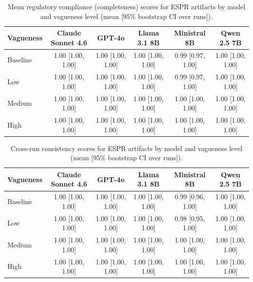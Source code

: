 \begin{table}[t]
  \centering
  \caption{Mean regulatory compliance (completeness) scores for ESPR artifacts by model and vagueness level (mean [95\% bootstrap CI over runs]).}
  \label{tab:espr_completeness}
  \begin{tabular}{lccccc}
    \toprule
    Vagueness & Claude Sonnet 4.6 & GPT-4o & Llama 3.1 8B & Ministral 8B & Qwen 2.5 7B \\
    \midrule
    Baseline & 1.00 {\scriptsize [1.00, 1.00]} & 1.00 {\scriptsize [1.00, 1.00]} & 1.00 {\scriptsize [1.00, 1.00]} & 0.99 {\scriptsize [0.97, 1.00]} & 1.00 {\scriptsize [1.00, 1.00]} \\
    Low & 1.00 {\scriptsize [1.00, 1.00]} & 1.00 {\scriptsize [1.00, 1.00]} & 1.00 {\scriptsize [1.00, 1.00]} & 0.99 {\scriptsize [0.97, 1.00]} & 1.00 {\scriptsize [1.00, 1.00]} \\
    Medium & 1.00 {\scriptsize [1.00, 1.00]} & 1.00 {\scriptsize [1.00, 1.00]} & 1.00 {\scriptsize [1.00, 1.00]} & 1.00 {\scriptsize [1.00, 1.00]} & 1.00 {\scriptsize [1.00, 1.00]} \\
    High & 1.00 {\scriptsize [1.00, 1.00]} & 1.00 {\scriptsize [1.00, 1.00]} & 1.00 {\scriptsize [1.00, 1.00]} & 1.00 {\scriptsize [1.00, 1.00]} & 1.00 {\scriptsize [1.00, 1.00]} \\
    \bottomrule
  \end{tabular}
\end{table}

\begin{table}[t]
  \centering
  \caption{Cross-run consistency scores for ESPR artifacts by model and vagueness level (mean [95\% bootstrap CI over runs]).}
  \label{tab:espr_consistency}
  \begin{tabular}{lccccc}
    \toprule
    Vagueness & Claude Sonnet 4.6 & GPT-4o & Llama 3.1 8B & Ministral 8B & Qwen 2.5 7B \\
    \midrule
    Baseline & 1.00 {\scriptsize [1.00, 1.00]} & 1.00 {\scriptsize [1.00, 1.00]} & 1.00 {\scriptsize [1.00, 1.00]} & 0.99 {\scriptsize [0.96, 1.00]} & 1.00 {\scriptsize [1.00, 1.00]} \\
    Low & 1.00 {\scriptsize [1.00, 1.00]} & 1.00 {\scriptsize [1.00, 1.00]} & 1.00 {\scriptsize [1.00, 1.00]} & 0.98 {\scriptsize [0.95, 1.00]} & 1.00 {\scriptsize [1.00, 1.00]} \\
    Medium & 1.00 {\scriptsize [1.00, 1.00]} & 1.00 {\scriptsize [1.00, 1.00]} & 1.00 {\scriptsize [1.00, 1.00]} & 1.00 {\scriptsize [1.00, 1.00]} & 1.00 {\scriptsize [1.00, 1.00]} \\
    High & 1.00 {\scriptsize [1.00, 1.00]} & 1.00 {\scriptsize [1.00, 1.00]} & 1.00 {\scriptsize [1.00, 1.00]} & 1.00 {\scriptsize [1.00, 1.00]} & 1.00 {\scriptsize [1.00, 1.00]} \\
    \bottomrule
  \end{tabular}
\end{table}

